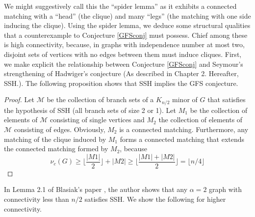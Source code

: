 We might suggestively call this the ``spider lemma'' as it exhibits a connected matching with a ``head'' (the clique) and many ``legs'' (the matching with one side inducing the clique).  Using the spider lemma, we deduce some structural qualities that a counterexample to Conjecture \ref{GFSconj} must possess.  Chief among these is high connectivity, because, in graphs with independence number at most two, disjoint sets of vertices with no edges between them must induce cliques.  First, we make explicit the relationship between Conjecture \ref{GFSconj} and Seymour's strengthening of Hadwiger's conjecture (As described in Chapter 2.  Hereafter, SSH.).  The following proposition shows that SSH implies the GFS conjecture.  


\begin{proof}
Let $\mathcal{M}$ be the collection of branch sets of a $K_{n/2}$ minor of $G$ that satisfies the hypothesis of SSH (all branch sets of size 2 or 1). Let $M_1$ be the collection of elements of $\mathcal{M}$ consisting of single vertices and $M_2$ the collection of elements of $\mathcal{M}$ consisting of edges.  Obviously, $M_2$  is a connected matching.  Furthermore, any matching of the clique induced by $M_1$ forms a connected matching that extends the connected matching formed by $M_2$, because 
\[\nu_c(G) \geq \lfloor\frac{|M1|}{2}\rfloor + |M2| \geq \lfloor\frac{|M1 | + |M2 |}{2}\rfloor = \lfloor n/4\rfloor\]
\end{proof}

In Lemma 2.1 of Blasiak's paper \cite{Blas}, the author shows that any $\alpha = 2$ graph with connectivity less
than $n/2$ satisfies SSH. We show the following for higher connectivity.  


